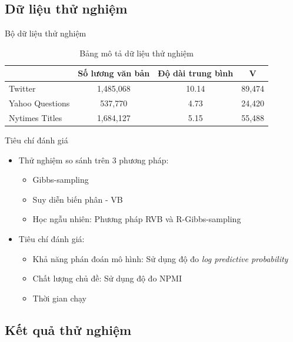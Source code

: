 \documentclass[pdf]{beamer}
\begin{document}
\subsection{Dữ liệu thử nghiệm}
\begin{frame}{Bộ dữ liệu thử nghiệm}
\begin{table}
	\begin{tabular}{l | c | c | c }
		& Số lương văn bản & Độ dài trung bình & V \\
		\hline \hline
		Twitter & 1,485,068 & 10.14 & 89,474 \\
		Yahoo Questions & 537,770 & 4.73 & 24,420  \\ 
		Nytimes Titles & 1,684,127 & 5.15 & 55,488
	\end{tabular}
	\caption{Bảng mô tả dữ liệu thử nghiệm}
\end{table}
\end{frame}
\begin{frame}{Tiêu chí đánh giá}
	\begin{itemize}
		\item Thử nghiệm so sánh trên 3 phương pháp: 
		\begin{itemize}
			\item Gibbs-sampling
			\item Suy diễn biến phân - VB
			\item Học ngẫu nhiên: Phương pháp RVB và R-Gibbs-sampling
		\end{itemize}
		\item Tiêu chí đánh giá:
		\begin{itemize}
			\item Khả năng phán đoán mô hình: Sử dụng độ đo \textit{log predictive probability}
			\item Chất lượng chủ đề: Sử dụng độ đo NPMI
			\item Thời gian chạy
		\end{itemize}
	\end{itemize}
\end{frame}
\subsection{Kết quả thử nghiệm}
\end{document}
